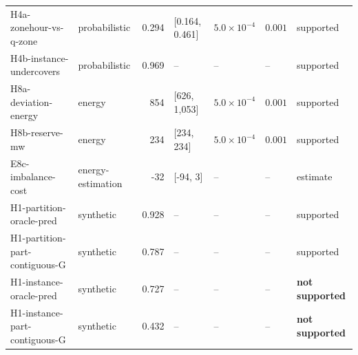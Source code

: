 \begin{table}[!htbp]
{\begin{tabular}{@{}l l r l l l l@{}}
H4a-zonehour-vs-q-zone & probabilistic & 0.294 & [0.164, 0.461] & $5.0\times10^{-4}$ & $0.001$ & supported \\
H4b-instance-undercovers & probabilistic & 0.969 & -- & -- & -- & supported \\
H8a-deviation-energy & energy & 854 & [626, 1,053] & $5.0\times10^{-4}$ & $0.001$ & supported \\
H8b-reserve-mw & energy & 234 & [234, 234] & $5.0\times10^{-4}$ & $0.001$ & supported \\
E8c-imbalance-cost & energy-estimation & -32 & [-94, 3] & -- & -- & estimate \\
H1-partition-oracle-pred & synthetic & 0.928 & -- & -- & -- & supported \\
H1-partition-part-contiguous-G & synthetic & 0.787 & -- & -- & -- & supported \\
H1-instance-oracle-pred & synthetic & 0.727 & -- & -- & -- & \textbf{not supported} \\
H1-instance-part-contiguous-G & synthetic & 0.432 & -- & -- & -- & \textbf{not supported} \\
\bottomrule\end{tabular}}\end{table}
